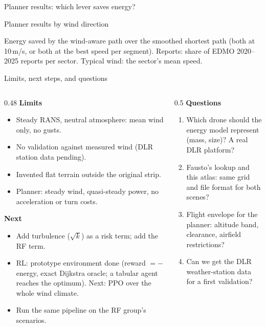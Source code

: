 \documentclass[aspectratio=169,10pt]{beamer}
\begin{document}
\begin{frame}{Planner results: which lever saves energy?}
\centering

\medskip
\raggedright\small
\PlanSentence
\end{frame}

\begin{frame}{Planner results by wind direction}
\centering

\medskip
\raggedright\footnotesize
Energy saved by the wind-aware path over the smoothed shortest path (both at 10\,m/s, or both at the best speed per segment). Reports: share of
EDMO 2020--2025 reports per sector. Typical wind: the sector's mean speed.
\end{frame}

\begin{frame}{Limits, next steps, and questions}
\begin{columns}[T]
\begin{column}{0.48\textwidth}\small
\textbf{Limits}
\begin{itemize}\setlength{\itemsep}{1pt}
  \item Steady RANS, neutral atmosphere: mean wind only, no gusts.
  \item No validation against measured wind (DLR station data pending).
  \item Invented flat terrain outside the original strip.
  \item Planner: steady wind, quasi-steady power, no acceleration or turn costs.
\end{itemize}
\textbf{Next}
\begin{itemize}\setlength{\itemsep}{1pt}
  \item Add turbulence ($\sqrt{k}$) as a risk term; add the RF term.
  \item RL: prototype environment done (reward $=-$energy, exact Dijkstra oracle; a tabular agent reaches the optimum). Next: PPO over the whole wind climate.
  \item Run the same pipeline on the RF group's scenarios.
\end{itemize}
\end{column}
\begin{column}{0.5\textwidth}\small
\textbf{Questions}
\begin{enumerate}\setlength{\itemsep}{2pt}
  \item Which drone should the energy model represent (mass, size)? A real DLR platform?
  \item Fausto's lookup and this atlas: same grid and file format for both scenes?
  \item Flight envelope for the planner: altitude band, clearance, airfield restrictions?
  \item Can we get the DLR weather-station data for a first validation?
\end{enumerate}
\end{column}
\end{columns}
\end{frame}
\end{document}
